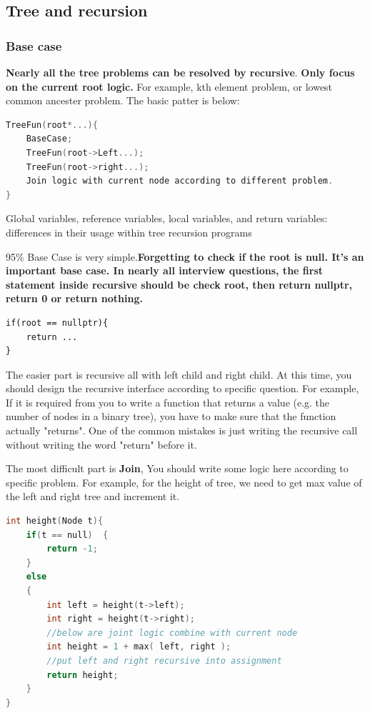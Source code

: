 \documentclass[a4paper,11pt,twoside]{book}
\begin{document}
\subsection{Tree and recursion} 
\subsubsection{Base case}

	\par \textbf{Nearly all the tree problems can be resolved by recursive}. \textbf{Only focus on the current root logic.} For example, kth element problem, or lowest common ancester problem. The basic patter is below: 
	
\begin{lstlisting}[frame=single, language=c++]
TreeFun(root*...){
	BaseCase;
	TreeFun(root->Left...);
	TreeFun(root->right...);
	Join logic with current node according to different problem.
}	
\end{lstlisting}

	\par Global variables, reference variables, local variables, and return variables: differences in their usage within tree recursion programs

	\par 95\% Base Case is very simple.\textbf{Forgetting to check if the root is null. It's an important base case. In nearly all interview questions, the first statement inside recursive should be check root, then return nullptr, return 0 or return nothing.}


\begin{lstlisting}
if(root == nullptr){
	return ...
}	
\end{lstlisting}	

	\par The easier part is recursive all with left child and right child. At this time, you should design the recursive interface according to specific question. For example, If it is required from you to write a function that returns a value (e.g. the number of nodes in a binary tree), you have to make sure that the function actually "returns". One of the common mistakes is just writing the recursive call without writing the word "return" before it.

	\par The most difficult part is \textbf{Join}, You should write some logic here according to specific problem. For example, for the height of tree, we need to get max value of the left and right tree and increment it. 
\begin{lstlisting}[frame=single, language=c++]
int height(Node t){
	if(t == null)  {  
		return -1;   
	}
	else
	{
		int left = height(t->left);
		int right = height(t->right);
		//below are joint logic combine with current node
		int height = 1 + max( left, right );
		//put left and right recursive into assignment
		return height;
	}
}			
\end{lstlisting}		
\end{document}
